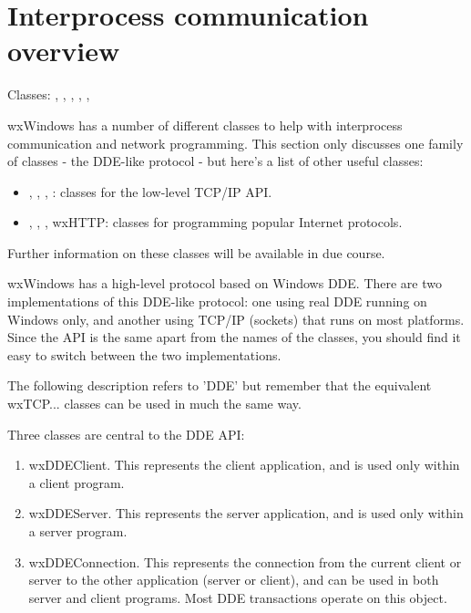 \section{Interprocess communication overview}\label{ipcoverview}

Classes: , , 
, 
, , 

wxWindows has a number of different classes to help with interprocess communication
and network programming. This section only discusses one family of classes - the DDE-like
protocol - but here's a list of other useful classes:

\begin{itemize}\itemsep=0pt
\item {}, 
, 
, 
: classes for the low-level TCP/IP API.
\item {}, , , wxHTTP: classes
for programming popular Internet protocols.
\end{itemize}

Further information on these classes will be available in due course.

wxWindows has a high-level protocol based on Windows DDE.
There are two implementations of this DDE-like protocol:
one using real DDE running on Windows only, and another using TCP/IP (sockets) that runs
on most platforms. Since the API is the same apart from the names of the classes, you
should find it easy to switch between the two implementations.

The following description refers to 'DDE' but remember that the equivalent wxTCP... classes
can be used in much the same way.

Three classes are central to the DDE API:

\begin{enumerate}\itemsep=0pt
\item wxDDEClient. This represents the client application, and is used
only within a client program.
\item wxDDEServer. This represents the server application, and is used
only within a server program.
\item wxDDEConnection. This represents the connection from the current
client or server to the other application (server or client), and can be used
in both server and client programs. Most DDE
transactions operate on this object.
\end{enumerate}

